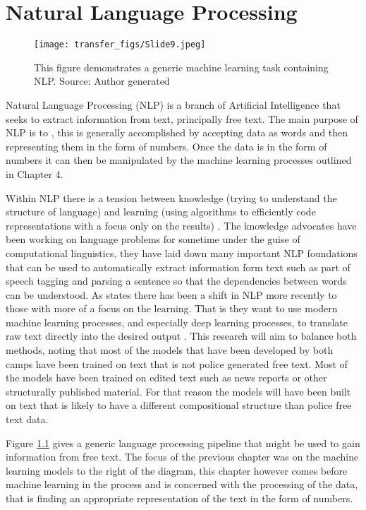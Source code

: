 \chapter{Natural Language Processing}

\begin{figure}
  \texttt{[image: transfer\_figs/Slide9.jpeg]}
  \caption[NLP process Overview.]{This figure demonstrates a generic machine learning task containing NLP. Source: Author generated}
  \label{fig:overview}
\end{figure}

Natural Language Processing (NLP) is a branch of Artificial Intelligence that seeks to extract information from text, principally free text. The main purpose of NLP is to  \parencite{eisenstein2018natural}, this is generally accomplished by accepting data as words and then representing them in the form of numbers. Once the data is in the form of numbers it can then be manipulated by the machine learning processes outlined in Chapter 4.

Within NLP there is a tension between knowledge (trying to understand the structure of language)  and  learning (using algorithms to efficiently code representations with a focus only on the results) \parencite{eisenstein2018natural}.  The knowledge advocates have been working on language problems for sometime under the guise of computational linguistics, they have laid down many important NLP foundations that can be used to automatically extract information form text such as part of speech tagging and parsing a sentence so that the dependencies between words can be understood. As \textcite{manning2015computational} states there has been a shift in NLP more recently to those with more of a focus on the learning. That is they want to use modern machine learning processes, and especially deep learning processes, to translate raw text directly into the desired output \parencite{eisenstein2018natural}. This research will aim to balance both methods, noting that most of the models that have been developed by both camps have been trained on text that is not police generated free text. Most of the models have been trained on edited text such as news reports or other structurally published material. For that reason the models will have been built on text that is likely to have a different compositional structure than police free text data.


Figure \ref{fig:overview} gives a generic language processing pipeline that might be used to gain information from free text. The focus of the previous chapter was on the machine learning models to the right of the diagram, this chapter however comes before machine learning in the process and is concerned with the processing of the data, that is finding an appropriate representation of the text in the form of numbers.

